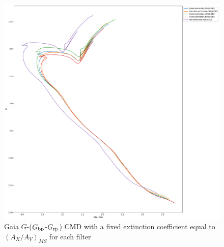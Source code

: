 \documentclass[12pt, a4paper]{report}
\begin{document}
\begin{figure}[h]
\begin{center}
\includegraphics[scale=0.3]{../basti_isochrones_10_13Gyr/Extinction_T5k_FeH0fix_func_G_GbpmGrp_500_400_600_Myr_FeH_0p002_ref_noext_Av_1p0.pdf}
\caption{Gaia $G$-($G_{\textnormal{bp}}$-$G_{\textnormal{rp}}$) CMD with a fixed extinction coefficient equal to $(A_{X}/A_{V})_{MS}$ for each filter}
\label{gaia_isoc_T5k}
\end{center}
\end{figure}
\end{document}

